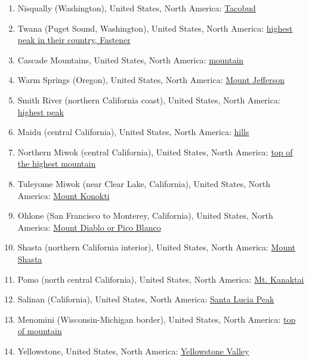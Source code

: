 \documentclass[10pt,twocolumn,letterpaper]{article}
\begin{document}
\begin{flushleft}
\begin{enumerate}
\item Nisqually (Washington), United States, North America: \href{http://www.talkorigins.org/faqs/flood-myths.html#Nisqually}{Tacobud}
\item Twana (Puget Sound, Washington), United States, North America: \href{http://www.talkorigins.org/faqs/flood-myths.html#Twana}{highest peak in their country, Fastener}
\item Cascade Mountains, United States, North America: \href{http://www.talkorigins.org/faqs/flood-myths.html#Cascade}{mountain}
\item Warm Springs (Oregon), United States, North America: \href{http://www.talkorigins.org/faqs/flood-myths.html#WarmSprings}{Mount Jefferson}
\item Smith River (northern California coast), United States, North America: \href{http://www.talkorigins.org/faqs/flood-myths.html#SmithRiver}{highest peak}
\item Maidu (central California), United States, North America: \href{http://www.talkorigins.org/faqs/flood-myths.html#Maidu}{hills}
\item Northern Miwok (central California), United States, North America: \href{http://www.talkorigins.org/faqs/flood-myths.html#Miwok}{top of the highest mountain}
\item Tuleyome Miwok (near Clear Lake, California), United States, North America: \href{http://www.talkorigins.org/faqs/flood-myths.html#Tuleyome}{Mount Konokti}
\item Ohlone (San Francisco to Monterey, California), United States, North America: \href{http://www.talkorigins.org/faqs/flood-myths.html#Ohlone}{Mount Diablo or Pico Blanco}
\item Shasta (northern California interior), United States, North America: \href{http://www.talkorigins.org/faqs/flood-myths.html#Shasta}{Mount Shasta}
\item Pomo (north central California), United States, North America: \href{http://www.talkorigins.org/faqs/flood-myths.html#Pomo}{Mt. Kanaktai}
\item Salinan (California), United States, North America: \href{http://www.talkorigins.org/faqs/flood-myths.html#Salinan}{Santa Lucia Peak}
\item Menomini (Wisconsin-Michigan border), United States, North America: \href{http://www.talkorigins.org/faqs/flood-myths.html#Menomini}{top of mountain}
\item Yellowstone, United States, North America: \href{http://www.talkorigins.org/faqs/flood-myths.html#Yellowstone}{Yellowstone Valley}

\end{enumerate}
\end{flushleft}
\end{document}
